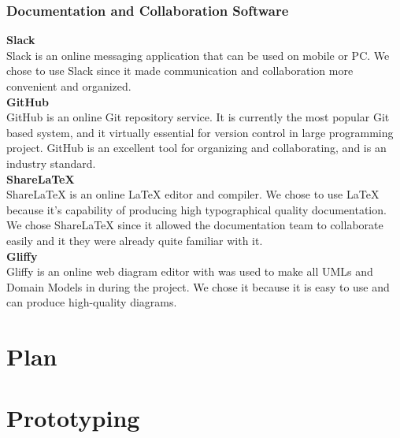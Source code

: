 \documentclass[12pt]{article}
\begin{document}
\subsubsection{Documentation and Collaboration Software}
\textbf{Slack}\\
Slack is an online messaging application that can be used on mobile or PC. We chose to use Slack since it made communication and collaboration more convenient and organized.
\\
%
\textbf{GitHub}\\
GitHub is an online Git repository service. It is currently the most popular Git based system, and it virtually essential for version control in large programming project. GitHub is an excellent tool for organizing and collaborating, and is an industry standard.
\\
%
\textbf{ShareLaTeX}\\
ShareLaTeX is an online LaTeX editor and compiler. We chose to use LaTeX because it's capability of producing high typographical quality documentation. We chose ShareLaTeX since it allowed the documentation team to collaborate easily and it they were already quite familiar with it. 
\\
%
\textbf{Gliffy}\\
Gliffy is an online web diagram editor with was used to make all UMLs and Domain Models in during the project. We chose it because it is easy to use and can produce high-quality diagrams.
\\
%
\section{Plan}



\section{Prototyping}
\end{document}
